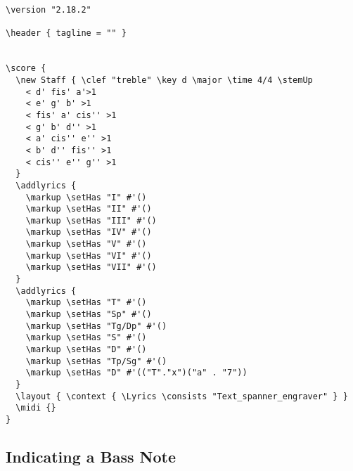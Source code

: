 \documentclass[
  DIV=calc,
  BCOR=5mm,
  12pt,
  headings=small,
  oneside,
  abstract=true,
  toc=bib,
  xcolor=dvipsnames,
  openany,
  ngerman,english]{scrartcl}
\begin{document}
\begin{center}
\end{center}
\begin{scriptsize}
\begin{verbatim}
\version "2.18.2"

\header { tagline = "" }

  
\score {
  \new Staff { \clef "treble" \key d \major \time 4/4 \stemUp
    < d' fis' a'>1 
    < e' g' b' >1  
    < fis' a' cis'' >1
    < g' b' d'' >1  
    < a' cis'' e'' >1 
    < b' d'' fis'' >1  
    < cis'' e'' g'' >1
  }
  \addlyrics {
    \markup \setHas "I" #'()
    \markup \setHas "II" #'()
    \markup \setHas "III" #'()
    \markup \setHas "IV" #'()
    \markup \setHas "V" #'()
    \markup \setHas "VI" #'()
    \markup \setHas "VII" #'()
  }
  \addlyrics {
    \markup \setHas "T" #'()
    \markup \setHas "Sp" #'()
    \markup \setHas "Tg/Dp" #'()
    \markup \setHas "S" #'()
    \markup \setHas "D" #'()
    \markup \setHas "Tp/Sg" #'()
    \markup \setHas "D" #'(("T"."x")("a" . "7"))
  }
  \layout { \context { \Lyrics \consists "Text_spanner_engraver" } }
  \midi {}
}
\end{verbatim}
\end{scriptsize}

\subsection{Indicating a Bass Note}
\end{document}
